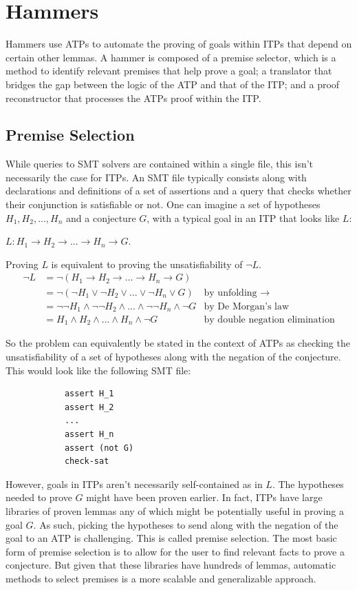 \documentclass{article}
\begin{document}
\section{Hammers}
\label{gen-hammers}
	Hammers use ATPs to automate the proving of goals within ITPs
	that depend on certain other lemmas. A hammer is composed of 
	a premise selector, which is a method to identify relevant 
	premises that help prove a goal; a translator that bridges 
	the gap between the logic of the ATP and that of the ITP; 
	and a proof reconstructor that processes the ATPs proof
	within the ITP.
	
	\subsection{Premise Selection}
		While queries to SMT solvers are contained within a single 
		file, this isn't necessarily the case for ITPs. An SMT file
		typically consists along with declarations and definitions 
		of a set of assertions and a query that checks whether 
		their conjunction is satisfiable or not. 
		One can imagine a set of hypotheses 
		$H_1, H_2, ..., H_n$ and a conjecture $G$, with a 
		typical goal in an ITP that looks like $L$:
		\begin{center}
			$L : H_1 \to H_2 \to ... \to H_n \to G$.
		\end{center}
		Proving $L$ is equivalent to proving the unsatisfiability 
		of $\neg L$.
		\begin{align*}
			\neg L &= \neg (H_1 \to H_2 \to ... \to H_n \to G)\\
			&= \neg (\neg H_1 \lor \neg H_2 \lor ... \lor \neg H_n \lor G)
			& \text{by unfolding }\to \\
			&= \neg \neg H_1 \land \neg \neg H_2 \land ... \land \neg \neg H_n 
			\land \neg G
			& \text{by De Morgan's law}\\
			&= H_1 \land H_2 \land ... \land H_n \land \neg G
			& \text{by double negation elimination}
		\end{align*}
	
		So the problem can equivalently be stated in the context of ATPs
		as checking the unsatisfiability of a set of hypotheses 
		along with the negation of the conjecture. This would look 
		like the following SMT file:
		\begin{verbatim}
			assert H_1
			assert H_2
			...
			assert H_n
			assert (not G)
			check-sat
		\end{verbatim}
		However, goals in ITPs aren't necessarily self-contained 
		as in $L$. The hypotheses needed to prove $G$ 
		might have been proven earlier. In fact, ITPs have large
		libraries of proven lemmas any of which might be potentially 
		useful in proving a goal $G$. As such, picking
		the hypotheses to send along with the negation of the 
		goal to an ATP is challenging. This is called premise 
		selection. The most basic form of premise selection 
		is to allow for the user to find relevant facts 
		to prove a conjecture. But given that these libraries 
		have hundreds of lemmas, automatic methods to select 
		premises is a more scalable and generalizable approach.
	
\end{document}
